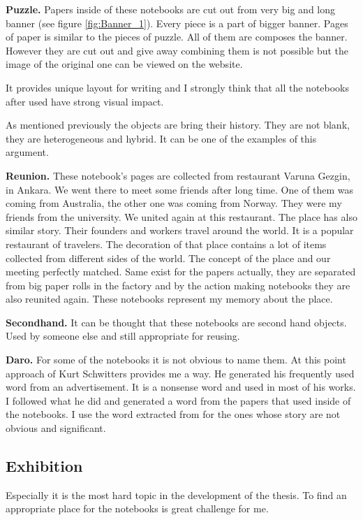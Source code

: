 \textbf{Puzzle.} Papers inside of these notebooks are cut out from very big and long banner (see figure \ref{fig:Banner_1}). Every piece is a part of bigger banner. Pages of paper is similar to the pieces of puzzle. All of them are composes the banner. However they are cut out and give away combining them is not possible but the image of the original one can be viewed on the website.

It provides unique layout for writing and I strongly think that all the notebooks after used have strong visual impact.

As mentioned previously the objects are bring their history. They are not blank, they are heterogeneous and hybrid. It can be one of the examples of this argument. 

\textbf{Reunion.} These notebook's pages are collected from restaurant Varuna Gezgin, in Ankara. We went there to meet some friends after long time. One of them was coming from Australia, the other one was coming from Norway. They were my friends from the university. We united again at this restaurant. The place has also similar story. Their founders and workers travel around the world. It is a popular restaurant of travelers. The decoration of that place contains a lot of items collected from different sides of the world. The concept of the place and our meeting perfectly matched. Same exist for the papers actually, they are separated from big paper rolls in the factory and by the action making notebooks they are also reunited again. These notebooks represent my memory about the place.

\textbf{Secondhand.} It can be thought that these notebooks are second hand objects. Used by someone else and still appropriate for reusing.

\textbf{Daro.} For some of the notebooks it is not obvious to name them. At this point approach of Kurt Schwitters provides me a way. He generated his frequently used word  from an advertisement. It is a nonsense word and used in most of his works. I followed what he did and generated a word from the papers that used inside of the notebooks. I use the word  extracted from  for the ones whose story are not obvious and significant.





%
%
\subsection{Exhibition}
Especially it is the most hard topic in the development of the thesis. To find an appropriate place for the notebooks is great challenge for me.

